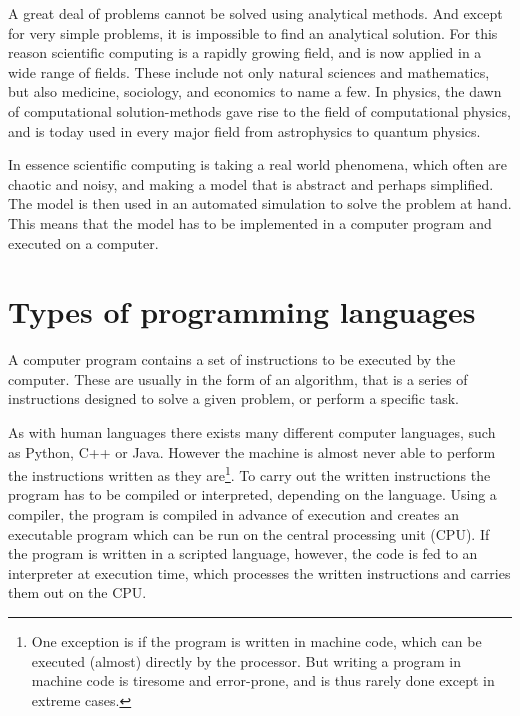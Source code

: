 A great deal of problems cannot be solved using analytical
methods. And except for very simple problems, it is impossible to
find an analytical solution. For this reason scientific computing is a
rapidly growing field, and is now applied in a wide range of
fields. These include not only natural sciences and mathematics, but
also medicine, sociology, and economics to name a few. In physics, the
dawn of computational solution-methods gave rise to the field of
computational physics, and is today used in every major field from
astrophysics to quantum physics.

In essence scientific computing is taking a real world phenomena,
which often are chaotic and noisy, and making a model that is abstract
and perhaps simplified. The model is then used in an automated
simulation to solve the problem at hand. This means that the model has
to be implemented in a computer program and executed on a computer.


\section{Types of programming languages}
	A computer program contains a set of instructions to be
        executed by the computer. These are usually in the form of an
        algorithm, that is a series of instructions designed to solve
        a given problem, or perform a specific task.

	As with human languages there exists many different computer
        languages, such as Python, C++ or Java. However the machine is
        almost never able to perform the instructions written as they
        are\footnote{One exception is if the program is written in
          machine code, which can be executed (almost) directly by the
          processor. But writing a program in machine code is tiresome
          and error-prone, and is thus rarely done except in extreme
          cases.}.  To carry out the written instructions the program
        has to be compiled or interpreted, depending on the
        language. Using a compiler, the program is compiled in advance
        of execution and creates an executable program which can be
        run on the central processing unit (CPU). If the program is
        written in a scripted language, however, the code is fed to an
        interpreter at execution time, which processes the written
        instructions and carries them out on the CPU.

